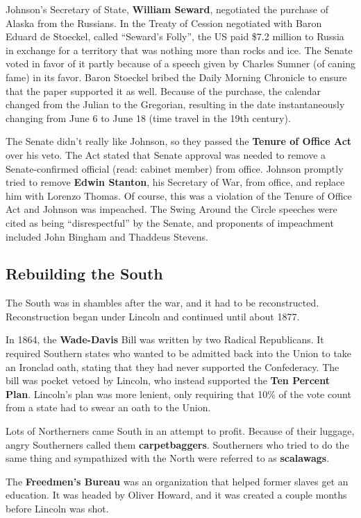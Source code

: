 Johnson's Secretary of State, \textbf{William Seward}, negotiated the purchase of Alaska from the Russians.
In the Treaty of Cession negotiated with Baron Eduard de Stoeckel, called ``Seward's Folly'',
the US paid \$7.2 million to Russia in exchange for a territory that was nothing more than rocks and ice.
The Senate voted in favor of it partly because of a speech given by Charles Sumner (of caning fame) in its favor.
Baron Stoeckel bribed the Daily Morning Chronicle to ensure that the paper supported it as well.
Because of the purchase, the calendar changed from the Julian to the Gregorian,
resulting in the date instantaneously changing from June 6 to June 18 (time travel in the 19th century).

The Senate didn't really like Johnson, so they passed the \textbf{Tenure of Office Act} over his veto.
The Act stated that Senate approval was needed to remove a Senate-confirmed official (read: cabinet member) from office.
Johnson promptly tried to remove \textbf{Edwin Stanton}, his Secretary of War, from office,
and replace him with Lorenzo Thomas.
Of course, this was a violation of the Tenure of Office Act and Johnson was impeached.
The Swing Around the Circle speeches were cited as being ``disrespectful'' by the Senate,
and proponents of impeachment included John Bingham and Thaddeus Stevens.

\subsection*{Rebuilding the South}

The South was in shambles after the war, and it had to be reconstructed.
Reconstruction began under Lincoln and continued until about 1877.

In 1864, the \textbf{Wade-Davis} Bill was written by two Radical Republicans.
It required Southern states who wanted to be admitted back into the Union to take an Ironclad oath,
stating that they had never supported the Confederacy.
The bill was pocket vetoed by Lincoln, who instead supported the \textbf{Ten Percent Plan}.
Lincoln's plan was more lenient,
only requiring that 10\% of the vote count from a state had to swear an oath to the Union.

Lots of Northerners came South in an attempt to profit.
Because of their luggage, angry Southerners called them \textbf{carpetbaggers}.
Southerners who tried to do the same thing and sympathized with the North were referred to as \textbf{scalawags}.

The \textbf{Freedmen's Bureau} was an organization that helped former slaves get an education.
It was headed by Oliver Howard, and it was created a couple months before Lincoln was shot.

